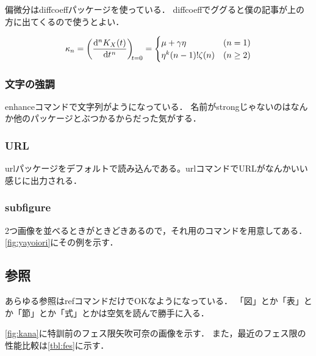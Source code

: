 偏微分はdiffcoeffパッケージを使っている．
diffcoeffでググると僕の記事が上の方に出てくるので使うとよい．

\begin{equation}
    \kappa_n = \diff[n]{K_X(t)}{t}[t=0] = \begin{cases}
        \mu+\gamma\eta & (n=1) \\
        \eta^k(n-1)!\zeta(n) & (n \geq 2)
    \end{cases}
    \label{eq:eq6}
\end{equation}

\subsubsection{文字の強調}

enhanceコマンドで文字列がようになっている．
名前がstrongじゃないのはなんか他のパッケージとぶつかるからだった気がする．

\subsubsection{URL}

urlパッケージをデフォルトで読み込んである。urlコマンドでURLがなんかいい感じに出力される．

\subsubsection{subfigure}

2つ画像を並べるときがときどきあるので，それ用のコマンドを用意してある．
\ref{fig:yayoiori}にその例を示す．


\subsection{参照}

あらゆる参照はrefコマンドだけでOKなようになっている．
「図」とか「表」とか「節」とか「式」とかは空気を読んで勝手に入る．

\ref{fig:kana}に特訓前のフェス限矢吹可奈の画像を示す．
また，最近のフェス限の性能比較は\ref{tbl:fes}に示す．


